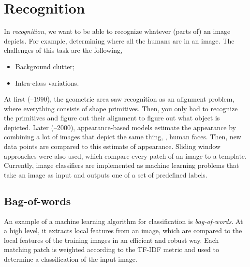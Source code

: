 \section{Recognition} \label{sec:recognition}

In \textit{recognition}, we want to be able to recognize whatever (parts of) an
image depicts. For example, determining where all the humans are in an image. The
challenges of this task are the following,
\begin{itemize}
  \item Background clutter;
  \item Intra-class variations.
\end{itemize}

At first (--1990), the geometric area saw recognition as an
alignment problem, where everything consists of shape primitives. Then, you
only had to recognize the primitives and figure out their alignment to figure
out what object is depicted. Later (--2000), appearance-based
models estimate the appearance by combining a lot of images that depict the
same thing, \eg, human faces. Then, new data points are compared to this
estimate of appearance. Sliding window approaches were also used, which compare
every patch of an image to a template. Currently, image classifiers are
implemented as machine learning problems that take an image as input and
outputs one of a set of predefined labels.

\subsection{Bag-of-words}

An example of a machine learning algorithm for classification is
\textit{bag-of-words}. At a high level, it extracts local features from an
image, which are compared to the local features of the training images in an
efficient and robust way. Each matching patch is weighted according to the
TF-IDF metric and used to determine a classification of the input image.


